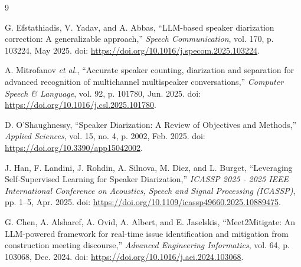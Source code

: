 \documentclass{article}
\begin{document}
\begin{thebibliography}{9}

G. Efstathiadis, V. Yadav, and A. Abbas,
``LLM-based speaker diarization correction: A generalizable approach,''
\textit{Speech Communication}, vol. 170, p. 103224, May 2025.
doi: \url{https://doi.org/10.1016/j.specom.2025.103224}.

A. Mitrofanov \textit{et al.},
``Accurate speaker counting, diarization and separation for advanced recognition of multichannel multispeaker conversations,''
\textit{Computer Speech \& Language}, vol. 92, p. 101780, Jun. 2025.
doi: \url{https://doi.org/10.1016/j.csl.2025.101780}.

D. O'Shaughnessy,
``Speaker Diarization: A Review of Objectives and Methods,''
\textit{Applied Sciences}, vol. 15, no. 4, p. 2002, Feb. 2025.
doi: \url{https://doi.org/10.3390/app15042002}.

J. Han, F. Landini, J. Rohdin, A. Silnova, M. Diez, and L. Burget,
``Leveraging Self-Supervised Learning for Speaker Diarization,''
\textit{ICASSP 2025 - 2025 IEEE International Conference on Acoustics, Speech and Signal Processing (ICASSP)}, pp. 1--5, Apr. 2025.
doi: \url{https://doi.org/10.1109/icassp49660.2025.10889475}.

G. Chen, A. Alsharef, A. Ovid, A. Albert, and E. Jaselskis,
``Meet2Mitigate: An LLM-powered framework for real-time issue identification and mitigation from construction meeting discourse,''
\textit{Advanced Engineering Informatics}, vol. 64, p. 103068, Dec. 2024.
doi: \url{https://doi.org/10.1016/j.aei.2024.103068}.

\end{thebibliography}
\end{document}
